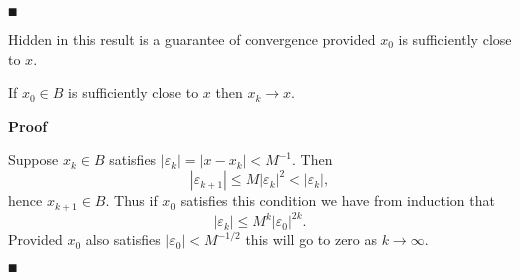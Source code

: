 \ensuremath{\QED}

Hidden in this result is a guarantee of convergence provided $x_0$ is sufficiently close to $x$.

\begin{corollary} If $x_0 \ensuremath{\in} B$ is sufficiently close to $x$ then $x_k \ensuremath{\rightarrow} x$.

\end{corollary}
\textbf{Proof}

Suppose $x_k \ensuremath{\in} B$ satisfies $|\ensuremath{\varepsilon}_k| = |x-x_k| < M^{-1}$. Then
\[
|\ensuremath{\varepsilon}_{k+1}| \ensuremath{\leq} M |\ensuremath{\varepsilon}_k|^2 < |\ensuremath{\varepsilon}_k|,
\]
hence $x_{k+1} \ensuremath{\in} B$. Thus if $x_0$ satisfies this condition we have from induction that
\[
|\ensuremath{\varepsilon}_k| \ensuremath{\leq} M^k |\ensuremath{\varepsilon}_0|^{2k}.
\]
Provided $x_0$ also satisfies $|\ensuremath{\varepsilon}_0| < M^{-1/2}$ this will go to zero as $k \ensuremath{\rightarrow} \ensuremath{\infty}$.

\ensuremath{\QED}



